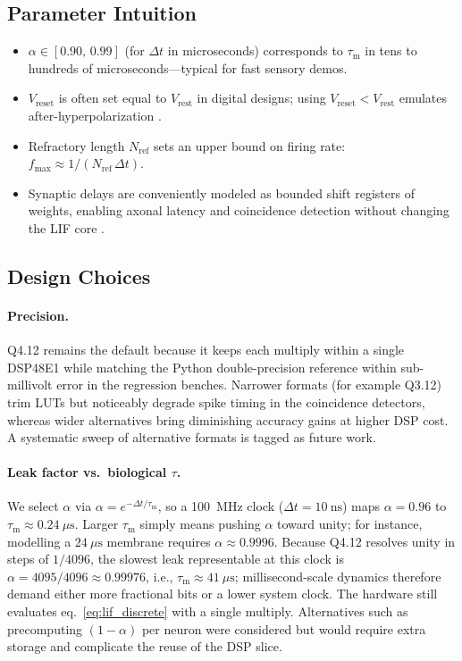 \documentclass[10pt,onecolumn]{IEEEtran}
\newcommand{\Vrest}{V_{\mathrm{rest}}}
\newcommand{\Vreset}{V_{\mathrm{reset}}}
\newcommand{\taum}{\tau_{\mathrm{m}}}
\begin{document}
\subsection*{Parameter Intuition}
\begin{itemize}
  \item \(\alpha \in [0.90,\,0.99]\) (for \(\Delta t\) in microseconds) corresponds to \(\taum\) in tens to hundreds of microseconds—typical for fast sensory demos.
  \item \(\Vreset\) is often set equal to \(\Vrest\) in digital designs; using \(\Vreset<\Vrest\) emulates after-hyperpolarization \cite{GerstnerKistler2002}.
  \item Refractory length \(N_{\mathrm{ref}}\) sets an upper bound on firing rate: \(f_{\max}\approx 1/(N_{\mathrm{ref}}\,\Delta t)\).
  \item Synaptic delays are conveniently modeled as bounded shift registers of weights, enabling axonal latency and coincidence detection without changing the LIF core \cite{GerstnerKistler2002,Maass1997}.
\end{itemize}

\subsection{Design Choices}
\paragraph{Precision.} Q4.12 remains the default because it keeps each multiply within a single DSP48E1 while matching the Python double-precision reference within sub-millivolt error in the regression benches. Narrower formats (for example Q3.12) trim LUTs but noticeably degrade spike timing in the coincidence detectors, whereas wider alternatives bring diminishing accuracy gains at higher DSP cost. A systematic sweep of alternative formats is tagged as future work.
\paragraph{Leak factor vs.\ biological \(\tau\).} We select \(\alpha\) via \(\alpha = e^{-\Delta t / \taum}\), so a 100~MHz clock (\(\Delta t=10~\mathrm{ns}\)) maps \(\alpha=0.96\) to \(\taum\approx 0.24~\mu\mathrm{s}\). Larger \(\taum\) simply means pushing \(\alpha\) toward unity; for instance, modelling a \(24~\mu\mathrm{s}\) membrane requires \(\alpha\approx 0.9996\). Because Q4.12 resolves unity in steps of \(1/4096\), the slowest leak representable at this clock is \(\alpha=4095/4096\approx 0.99976\), i.e., \(\taum\approx 41~\mu\mathrm{s}\); millisecond-scale dynamics therefore demand either more fractional bits or a lower system clock. The hardware still evaluates eq.~\eqref{eq:lif_discrete} with a single multiply. Alternatives such as precomputing \((1-\alpha)\) per neuron were considered but would require extra storage and complicate the reuse of the DSP slice.
\end{document}
